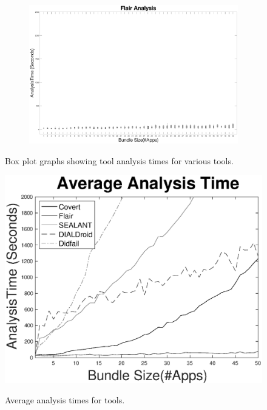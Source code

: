 \documentclass[twocolumn]{article}
\begin{document}
\begin{figure}[ht]
\begin{subfigure}{0.5\textwidth}
		\caption{}
	\end{subfigure}%
	\begin{subfigure}{0.5\textwidth}
		\centering
		\includegraphics[width=1\linewidth]{FlairBoxPlot}
		\caption{}
	\end{subfigure}
	
	\label{figure:1}
	\caption{Box plot graphs showing tool analysis times for various tools.}
\end{figure}

\twocolumn
	\begin{figure}
		\includegraphics[width=\linewidth]{AverageGraph}
		\label{figure:2}
		\caption{Average analysis times for tools.}
	\end{figure}
	
\end{document}
